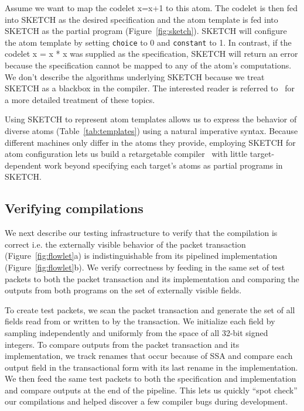 Assume we want to map the codelet x=x+1 to this atom. The codelet is then fed
into SKETCH as the desired specification and the atom template is fed into
SKETCH as the partial program (Figure~\ref{fig:sketch}). SKETCH will configure
the atom template by setting \texttt{choice} to 0 and \texttt{constant} to 1.
In contrast, if the codelet x = x * x was supplied as the specification, SKETCH
will return an error because the specification cannot be mapped to any of the
atom's computations. We don't describe the algorithms underlying SKETCH because
we treat SKETCH as a blackbox in the \pktlanguage compiler. The interested
reader is referred to~\cite{bitstreaming, sketch_asplos} for a more detailed
treatment of these topics.

Using SKETCH to represent atom templates allows us to express the behavior of
diverse atoms (Table~\ref{tab:templates}) using a natural imperative syntax.
Because different \absmachine machines only differ in the atoms they provide,
employing SKETCH for atom configuration lets us build a retargetable
compiler~\cite{lcc} with little target-dependent work beyond specifying each
target's atoms as partial programs in SKETCH.

\subsection{Verifying compilations}
\label{ss:verification}

We next describe our testing infrastructure to verify that the
compilation is correct i.e. the externally visible behavior of the packet
transaction (Figure~\ref{fig:flowlet}a) is indistinguishable from its pipelined
implementation (Figure~\ref{fig:flowlet}b). We verify correctness by feeding in
the same set of test packets to both the packet transaction and its
implementation and comparing the outputs from both programs on the set of
externally visible fields.

To create test packets, we scan the packet transaction and generate the set of
all fields read from or written to by the transaction. We initialize each field
by sampling independently and uniformly from the space of all 32-bit signed
integers.  To compare outputs from the packet transaction and its
implementation, we track renames that occur because of SSA and compare each
output field in the transactional form with its last rename in the
implementation. We then feed the same test packets to both the specification
and implementation and compare outputs at the end of the pipeline. This lets us
quickly ``spot check'' our compilations and helped discover a few compiler bugs
during development.

